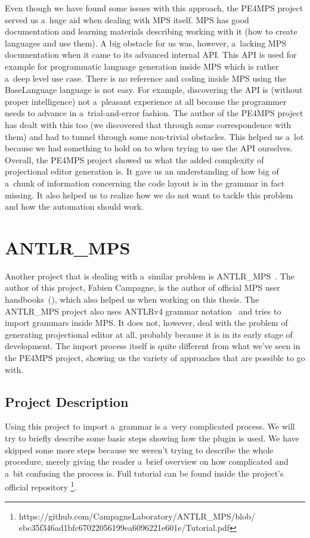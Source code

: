 Even though we have found some issues with this approach, the PE4MPS project served us a~huge aid when dealing with MPS itself.
MPS has good documentation and learning materials describing working with it (how to create languages and use them).
A big obstacle for us was, however, a~lacking MPS documentation when it came to its advanced internal API.
This API is used for example for programmatic language generation inside MPS which is rather a~deep level use case.
There is no reference and coding inside MPS using the BaseLanguage language is not easy.
For example, discovering the API is (without proper intelligence) not a~pleasant experience at all because the programmer needs to advance in a~trial-and-error fashion.
The author of the PE4MPS project has dealt with this too (we discovered that through some correspondence with them) and had to tunnel through some non-trivial obstacles.
This helped us a~lot because we had something to hold on to when trying to use the API ourselves.
\\

Overall, the PE4MPS project showed us what the added complexity of projectional editor generation is.
It gave us an understanding of how big of a~chunk of information concerning the code layout is in the grammar in fact missing.
It also helped us to realize how we do not want to tackle this problem and how the automation should work.

\section{ANTLR{\_}MPS}
Another project that is dealing with a~similar problem is ANTLR{\_}MPS~\cite{ANTLR2MPS}.
The author of this project, Fabien Campagne, is the author of official MPS user handbooks~(\cite{MPS1}\cite{MPS2}), which also helped us when working on this thesis.
The ANTLR{\_}MPS project also uses ANTLRv4 grammar notation~\cite{ANTLR4} and tries to import grammars inside MPS.
It does not, however, deal with the problem of generating projectional editor at all, probably because it is in its early stage of development.
The import process itself is quite different from what we've seen in the PE4MPS project, showing us the variety of approaches that are possible to go with.

\subsection{Project Description}
Using this project to import a~grammar is a~very complicated process.
We will try to briefly describe some basic steps showing how the plugin is used.
We have skipped some more steps because we weren't trying to describe the whole procedure, merely giving the reader a~brief overview on how complicated and a~bit confusing the process is.
Full tutorial can be found inside the project's official repository \footnote{https://github.com/CampagneLaboratory/ANTLR{\_}MPS/blob/ ebc35f346ad1bfc67022056199ea6096221e601e/Tutorial.pdf}.
\\

